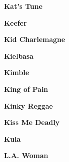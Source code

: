 \begin{center}\textbf{Kat's Tune}\end{center}
\newline
\vspace{10pt} 
\begin{center}\textbf{Keefer}\end{center}
\newline
\vspace{10pt} 
\begin{center}\textbf{Kid Charlemagne}\end{center}
\newline
\vspace{10pt} 
\begin{center}\textbf{Kielbasa}\end{center}
\newline
\vspace{10pt} 
\begin{center}\textbf{Kimble}\end{center}
\newline
\vspace{10pt} 
\begin{center}\textbf{King of Pain}\end{center}
\newline
\vspace{10pt} 
\begin{center}\textbf{Kinky Reggae}\end{center}
\newline
\vspace{10pt} 
\begin{center}\textbf{Kiss Me Deadly}\end{center}
\newline
\vspace{10pt} 
\begin{center}\textbf{Kula}\end{center}
\newline
\vspace{10pt} 
\begin{center}\textbf{L.A. Woman}\end{center}
\newline
